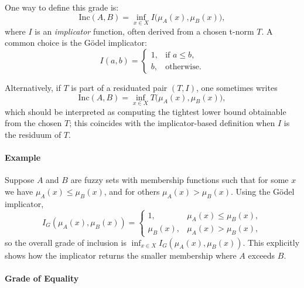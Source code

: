 One way to define this grade is:
\begin{equation}
\mathrm{Inc}(A, B) = \inf_{x \in X} I\big(\mu_A(x), \mu_B(x)\big),
\label{eq:grade_inclusion}
\end{equation}
where \( I \) is an \emph{implicator} function, often derived from a chosen t\hyp{}norm \(T\). A common choice is the G\"odel implicator:
\begin{equation}
I(a, b) = \begin{cases}
1, & \text{if } a \leq b, \\
b, & \text{otherwise}.
\end{cases}
\label{eq:godel_implicator}
\end{equation}

Alternatively, if \( T \) is part of a residuated pair \((T, I)\), one sometimes writes
\[
\mathrm{Inc}(A, B) = \inf_{x \in X} T\big(\mu_A(x), \mu_B(x)\big),
\]
which should be interpreted as computing the tightest lower bound obtainable from the chosen \(T\); this coincides with the implicator-based definition when \(I\) is the residuum of \(T\).

\paragraph{Example}

Suppose \( A \) and \( B \) are fuzzy sets with membership functions such that for some \( x \) we have \(\mu_A(x) \leq \mu_B(x)\), and for others \(\mu_A(x) > \mu_B(x)\). Using the G\"odel implicator,
\[
I_G(\mu_A(x),\mu_B(x)) =
\begin{cases}
1, & \mu_A(x) \leq \mu_B(x),\\
\mu_B(x), & \mu_A(x) > \mu_B(x),
\end{cases}
\]
so the overall grade of inclusion is \(\inf_{x \in X} I_G(\mu_A(x),\mu_B(x))\). This explicitly shows how the implicator returns the smaller membership where \(A\) exceeds \(B\).

\paragraph{Grade of Equality}

